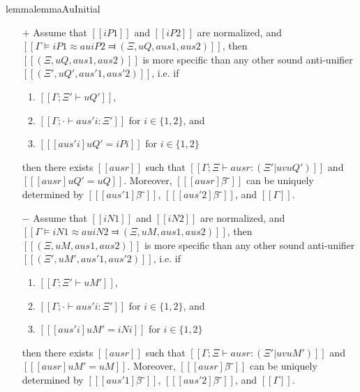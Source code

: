 \begin{restatable}{lemma}{lemmaAuInitial} \label{lemma:au-initial}
    \hfill
    \begin{itemize}
        \item [$+$] 
            Assume that $[[iP1]]$ and $[[iP2]]$ are normalized, and
            $[[Γ ⊨ iP1 ≈au iP2 ⫤ (Ξ, uQ, aus1, aus2)]]$, 
            then $[[(Ξ, uQ, aus1, aus2)]]$ is more specific than
            any other sound anti-unifier $[[(Ξ', uQ', aus'1, aus'2)]]$, i.e.
            if 
            \begin{enumerate}
                \item $[[Γ ; Ξ' ⊢ uQ']]$,
                \item $[[Γ ; · ⊢ aus'i : Ξ']]$ for $i \in \{1,2\}$, and
                \item $[[ [aus'i] uQ' = iPi ]]$ for $i \in \{1,2\}$
            \end{enumerate}
            then there exists $[[ausr]]$ such that
            $[[Γ ; Ξ ⊢ ausr : (Ξ' | uv uQ')]]$ and $[[ [ausr] uQ' = uQ ]]$. 
            Moreover, $[[ [ausr]β̂⁻]]$ can
            be uniquely determined by $[[ [aus'1]β̂⁻ ]]$, $[[ [aus'2]β̂⁻ ]]$, and
            $[[Γ]]$.
        \item [$-$] 
            Assume that $[[iN1]]$ and $[[iN2]]$ are normalized, and
            $[[Γ ⊨ iN1 ≈au iN2 ⫤ (Ξ, uM, aus1, aus2)]]$, 
            then $[[(Ξ, uM, aus1, aus2)]]$ is more specific than
            any other sound anti-unifier $[[(Ξ', uM', aus'1, aus'2)]]$, i.e.
            if
            \begin{enumerate}
                \item $[[Γ ; Ξ' ⊢ uM']]$,
                \item $[[Γ ; · ⊢ aus'i : Ξ']]$ for $i \in \{1,2\}$, and
                \item $[[ [aus'i] uM' = iNi ]]$ for $i \in \{1,2\}$
            \end{enumerate}
            then there exists $[[ausr]]$ such that
            $[[Γ ; Ξ ⊢ ausr : (Ξ' | uv uM')]]$ and $[[ [ausr] uM' = uM ]]$.
            Moreover, $[[ [ausr]β̂⁻]]$ can
            be uniquely determined by $[[ [aus'1]β̂⁻ ]]$, $[[ [aus'2]β̂⁻ ]]$, and
            $[[Γ]]$.
    \end{itemize}
\end{restatable}
